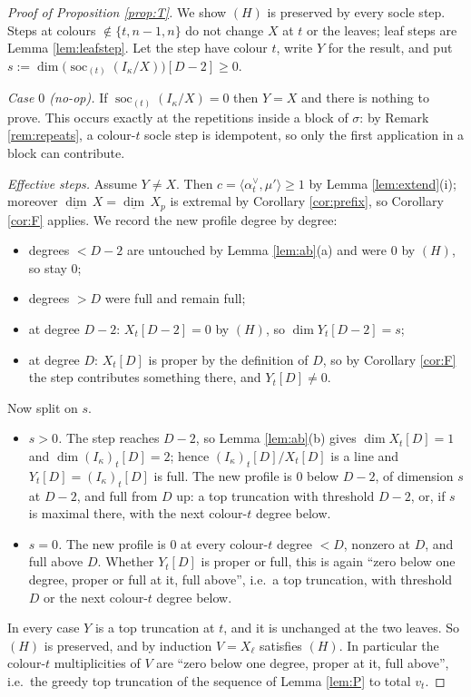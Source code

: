 \documentclass[reqno]{amsart}
\theoremstyle{plain}
\theoremstyle{definition}
\DeclareMathOperator{\soc}{soc}
\newcommand{\dimv}{\underline{\dim}\,}
\newcommand{\al}{\alpha}
\newcommand{\ka}{\kappa}
\begin{document}
\begin{proof}[Proof of Proposition \ref{prop:T}]
We show $(H)$ is preserved by every socle step.  Steps at colours
$\notin\{t,n-1,n\}$ do not change $X$ at $t$ or the leaves; leaf steps are
Lemma \ref{lem:leafstep}.  Let the step have colour $t$, write $Y$ for the
result, and put $s:=\dim\bigl(\soc_{(t)}(I_\ka/X)\bigr)[D-2]\ge0$.

\emph{Case $0$ (no-op).}  If $\soc_{(t)}(I_\ka/X)=0$ then $Y=X$ and there is
nothing to prove.  This occurs exactly at the repetitions inside a block of
$\sigma$: by Remark \ref{rem:repeats}, a colour-$t$ socle step is idempotent,
so only the first application in a block can contribute.

\emph{Effective steps.}  Assume $Y\ne X$.  Then $c=\langle\al_t^\vee,\mu'\rangle
\ge1$ by Lemma \ref{lem:extend}(i); moreover $\dimv X=\dimv X_p$ is extremal
by Corollary \ref{cor:prefix}, so Corollary \ref{cor:F} applies.  We
record the new profile degree by degree:
\begin{itemize}\itemsep1pt
\item degrees $<D-2$ are untouched by Lemma \ref{lem:ab}(a) and were $0$ by
$(H)$, so stay $0$;
\item degrees $>D$ were full and remain full;
\item at degree $D-2$: $X_t[D-2]=0$ by $(H)$, so $\dim Y_t[D-2]=s$;
\item at degree $D$: $X_t[D]$ is proper by the definition of $D$, so by
Corollary \ref{cor:F} the step contributes something there, and $Y_t[D]\ne0$.
\end{itemize}
Now split on $s$.
\begin{itemize}\itemsep1pt
\item \emph{$s>0$.}  The step reaches $D-2$, so Lemma \ref{lem:ab}(b) gives
$\dim X_t[D]=1$ and $\dim(I_\ka)_t[D]=2$; hence $(I_\ka)_t[D]/X_t[D]$ is a line
and $Y_t[D]=(I_\ka)_t[D]$ is full.  The new profile is $0$ below $D-2$, of
dimension $s$ at $D-2$, and full from $D$ up: a top truncation with threshold
$D-2$, or, if $s$ is maximal there, with the next colour-$t$ degree below.
\item \emph{$s=0$.}  The new profile is $0$ at every colour-$t$ degree $<D$,
nonzero at $D$, and full above $D$.  Whether $Y_t[D]$ is proper or full, this
is again ``zero below one degree, proper or full at it, full above'', i.e.\ a
top truncation, with threshold $D$ or the next colour-$t$ degree below.
\end{itemize}
In every case $Y$ is a top truncation at $t$, and it is unchanged at the two
leaves.  So $(H)$ is preserved, and by induction $V=X_\ell$ satisfies $(H)$.  In
particular the colour-$t$ multiplicities of $V$ are ``zero below one degree,
proper at it, full above'', i.e.\ the greedy top truncation of the sequence of
Lemma \ref{lem:P} to total $v_t$.
\end{proof}
\end{document}
